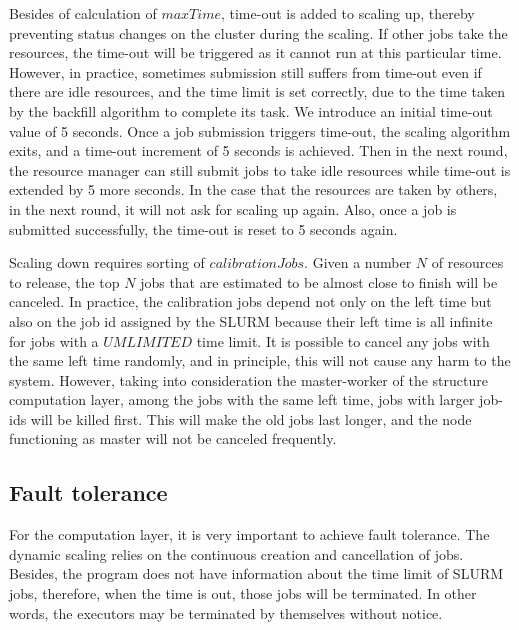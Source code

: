 Besides of calculation of $maxTime$, time-out is added to scaling up, thereby preventing status changes on the cluster during the scaling.
If other jobs take the resources, the time-out will be triggered as it cannot run at this particular time.
However, in practice, sometimes submission still suffers from time-out even if there are idle resources, and the time limit is set correctly, due to the time taken by the backfill algorithm to complete its task.
We introduce an initial time-out value of 5 seconds.
Once a job submission triggers time-out, the scaling algorithm exits, and a time-out increment of 5 seconds is achieved.
Then in the next round, the resource manager can still submit jobs to take idle resources while time-out is extended by 5 more seconds. 
In the case that the resources are taken by others, in the next round, it will not ask for scaling up again.
Also, once a job is submitted successfully, the time-out is reset to 5 seconds again.

Scaling down requires sorting of  $calibrationJobs$. Given a number $ N $ of resources to release, the top $ N $ jobs that are estimated to be almost close to finish will be canceled.
In practice, the calibration jobs depend not only on the left time but also on the job id assigned by the SLURM because their left time is all infinite for jobs with a $UMLIMITED$ time limit.
It is possible to cancel any jobs with the same left time randomly, and in principle, this will not cause any harm to the system.
However, taking into consideration the master-worker of the structure computation layer, among the jobs with the same left time, jobs with larger job-ids will be killed first.
This will make the old jobs last longer, and the node functioning as master will not be canceled frequently.

\subsection{Fault tolerance}

For the computation layer, it is very important to achieve fault tolerance. 
The dynamic scaling relies on the continuous creation and cancellation of jobs. 
Besides, the program does not have information about the time limit of SLURM jobs, therefore, when the time is out, those jobs will be terminated. 
In other words, the executors may be terminated by themselves without notice.

